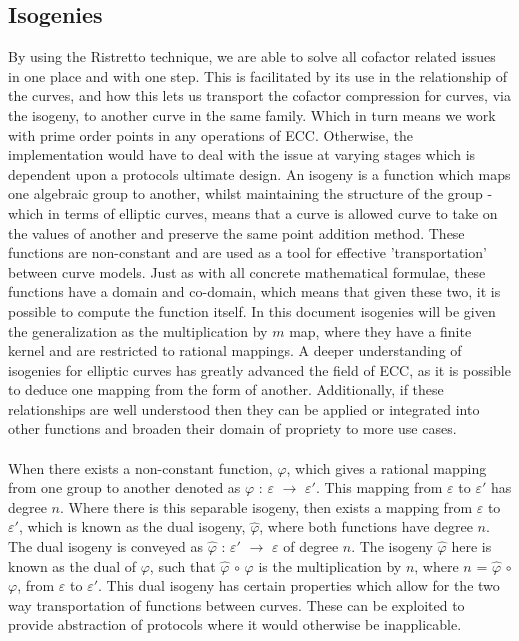 \documentclass{article}
\begin{document}
\subsection{Isogenies}
By using the Ristretto technique, we are able to solve all cofactor related issues in one place and with one step. This is facilitated by its use in the relationship of the curves, and how this lets us transport the cofactor compression for curves, via the isogeny, to another curve in the same family. Which in turn means we work with prime order points in any operations of ECC. Otherwise, the implementation would have to deal with the issue at varying stages which is dependent upon a protocols ultimate design. An isogeny is a function which maps one algebraic group to another, whilst maintaining the structure of the group - which in terms of elliptic curves, means that a curve is allowed curve to take on the values of another and preserve the same point addition method. These functions are non-constant and are used as a tool for effective 'transportation' between curve models. Just as with all concrete mathematical formulae, these functions have a domain and co-domain, which means that given these two, it is possible to compute the function itself. In this document isogenies will be given the generalization as the multiplication by $m$ map, where they have a finite kernel and are restricted to rational mappings.  
A deeper understanding of isogenies for elliptic curves has greatly advanced the field of ECC, as it is possible to deduce one mapping from the form of another. Additionally, if these relationships are well understood then they can be applied or integrated into other functions and broaden their domain of propriety to more use cases.\\\\
When there exists a non-constant function, $\varphi$, which gives a rational mapping from one group to another denoted as $\varphi$ : $\varepsilon$ $\rightarrow$ $\varepsilon\prime$. This mapping from $\varepsilon$ to $\varepsilon\prime$ has degree $n$. Where there is this separable isogeny, then exists a mapping from $\varepsilon$ to $\varepsilon\prime$, which is known as the dual isogeny, $\hat{\varphi}$, where both functions have degree $n$. The dual isogeny is conveyed as $\hat{\varphi}$ : $\varepsilon\prime$ $\rightarrow$ $\varepsilon$ of degree $n$. The isogeny $\hat{\varphi}$ here is known as the dual of $\varphi$, such that $\hat{\varphi}$ $\circ$ $\varphi$ is the multiplication by $n$, where $n$ = $\hat{\varphi}$ $\circ$ $\varphi$, from $\varepsilon$ to $\varepsilon\prime$. This dual isogeny has certain properties which allow for the two way transportation of functions between curves. These can be exploited to provide abstraction of protocols where it would otherwise be inapplicable.
\end{document}
